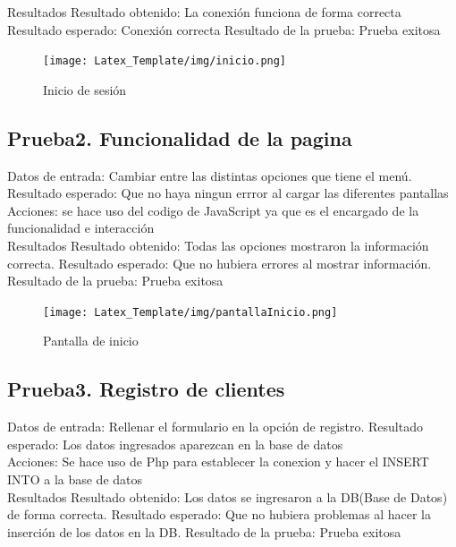\documentclass[a4paper,12pt]{article}
\begin{document}
Resultados
Resultado obtenido: La conexión funciona de forma correcta
Resultado esperado: Conexión correcta
Resultado de la prueba: Prueba exitosa\\



\begin{figure}[ht]
  \centering
  \texttt{[image: Latex\_Template/img/inicio.png]}
    \centering\caption{Inicio de sesión}
    \label{fig:image}
\end{figure}

    



\subsection{Prueba2. Funcionalidad de la pagina}
Datos de entrada: Cambiar entre las distintas opciones que tiene el menú. 
Resultado esperado: Que no haya ningun errror al cargar las diferentes pantallas\\

Acciones: se hace uso del codigo de JavaScript ya que es el encargado de la funcionalidad e interacción\\

Resultados
Resultado obtenido: Todas las opciones mostraron la información correcta. 
Resultado esperado: Que no hubiera errores al mostrar información. 
Resultado de la prueba: Prueba exitosa\\

\begin{figure}[ht]
  \centering
  \texttt{[image: Latex\_Template/img/pantallaInicio.png]}
    \caption{Pantalla de inicio}
    \label{fig:image}
\end{figure}


\subsection{Prueba3. Registro de clientes}
Datos de entrada: Rellenar el formulario en la opción de registro. 
Resultado esperado: Los datos ingresados aparezcan en la base de datos\\

Acciones: Se hace uso de Php para establecer la conexion y hacer el INSERT INTO a la base de datos \\

Resultados
Resultado obtenido: Los datos se ingresaron a la DB(Base de Datos) de forma correcta.
Resultado esperado: Que no hubiera problemas al hacer la inserción de los datos en la DB. 
Resultado de la prueba: Prueba exitosa\\
\end{document}
